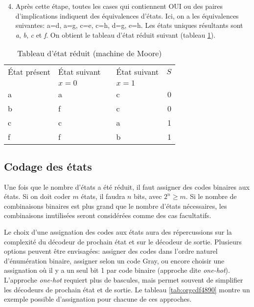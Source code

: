\documentclass[11pt]{article}
\begin{document}
\begin{enumerate}
\setcounter{enumi}{3}
\item Après cette étape, toutes les  cases qui contiennent OUI ou des
paires d'implications indiquent des équivalences d'états. Ici, on a
les équivalences suivantes: a=d, a=g, c=e, c=h, d=g, e=h. Les états
uniques résultants sont \emph{a}, \emph{b}, \emph{c} et \emph{f}. On obtient le tableau
d'état réduit suivant (tableau \ref{tab:org7cc7168}).
\end{enumerate}

\begin{table}[htbp]
\caption{\label{tab:org7cc7168}Tableau d'état réduit (machine de Moore)}
\centering
\begin{tabular}{llllr}
État présent & État suivant &  & État suivant & \(S\)\\[0pt]
 & \(x=0\) &  & \(x=1\) & \\[0pt]
\hline
a & a &  & c & 0\\[0pt]
b & f &  & c & 0\\[0pt]
c & c &  & a & 1\\[0pt]
f & f &  & b & 1\\[0pt]
\end{tabular}
\end{table}


\subsection{Codage des états}
\label{sec:org4bdd4d0}

Une fois que le nombre d'états a été réduit, il faut assigner des
codes binaires aux états. Si on doit coder \(m\) états, il faudra
\(n\) bits, avec \(2^n \geq m\). Si le nombre de combinaisons
binaires est plus grand que le nombre d'états nécessaires, les
combinaisons inutilisées seront considérées comme des cas facultatifs.

Le choix d'une assignation des codes aux états aura des répercussions
sur la complexité du décodeur de prochain état et sur le décodeur de
sortie. Plusieurs options peuvent être envisagées: assigner des codes
dans l'ordre naturel d'énumération binaire, assigner selon un code
Gray, ou encore choisir une assignation où il y a un seul bit 1 par
code binaire (approche dite \emph{one-hot}). L'approche \emph{one-hot} requiert
plus de bascules, mais permet souvent de simplifier les décodeurs de
prochain état et de sortie. Le tableau \ref{tab:orgcdf4890} montre
un exemple possible d'assignation pour chacune de ces approches.
\end{document}
